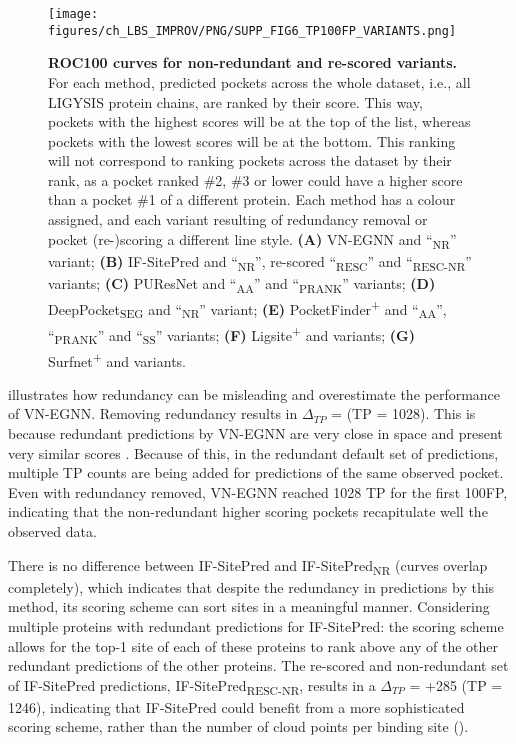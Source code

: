 \begin{figure}[htbp!]
    \centering
    \texttt{[image: figures/ch\_LBS\_IMPROV/PNG/SUPP\_FIG6\_TP100FP\_VARIANTS.png]}
    \caption[ROC100 curves for non-redundant and re-scored variants]{\textbf{ROC100 curves for non-redundant and re-scored variants.} For each method, predicted pockets across the whole dataset, i.e., all LIGYSIS protein chains, are ranked by their score. This way, pockets with the highest scores will be at the top of the list, whereas pockets with the lowest scores will be at the bottom. This ranking will not correspond to ranking pockets across the dataset by their rank, as a pocket ranked \#2, \#3 or lower could have a higher score than a pocket \#1 of a different protein. Each method has a colour assigned, and each variant resulting of redundancy removal or pocket (re-)scoring a different line style. \textbf{(A)} VN-EGNN and ``\textsubscript{NR}'' variant; \textbf{(B)} IF-SitePred and ``\textsubscript{NR}'', re-scored ``\textsubscript{RESC}'' and ``\textsubscript{RESC-NR}'' variants; \textbf{(C)} PUResNet and ``\textsubscript{AA}'' and ``\textsubscript{PRANK}'' variants; \textbf{(D)} DeepPocket\textsubscript{SEG} and ``\textsubscript{NR}'' variant; \textbf{(E)} PocketFinder\textsuperscript{+} and ``\textsubscript{AA}'', ``\textsubscript{PRANK}'' and ``\textsubscript{SS}'' variants; \textbf{(F)} Ligsite\textsuperscript{+} and variants; \textbf{(G)} Surfnet\textsuperscript{+} and variants.}
    \label{fig:pocket_ROC100_variants}
\end{figure}


 illustrates how redundancy can be misleading and overestimate the performance of VN-EGNN. Removing redundancy results in $\Delta_{TP}$ =  (TP = 1028). This is because redundant predictions by VN-EGNN are very close in space and present very similar scores . Because of this, in the redundant default set of predictions, multiple TP counts are being added for predictions of the same observed pocket. Even with redundancy removed, VN-EGNN reached 1028 TP for the first 100FP, indicating that the non-redundant higher scoring pockets recapitulate well the observed data.

There is no difference between IF-SitePred and IF-SitePred\textsubscript{NR} (curves overlap completely), which indicates that despite the redundancy in predictions by this method, its scoring scheme can sort sites in a meaningful manner. Considering multiple proteins with redundant predictions for IF-SitePred: the scoring scheme allows for the top-1 site of each of these proteins to rank above any of the other redundant predictions of the other proteins. The re-scored and non-redundant set of IF-SitePred predictions, IF-SitePred\textsubscript{RESC-NR}, results in a $\Delta_{TP}$ = +285 (TP = 1246), indicating that IF-SitePred could benefit from a more sophisticated scoring scheme, rather than the number of cloud points per binding site ().

